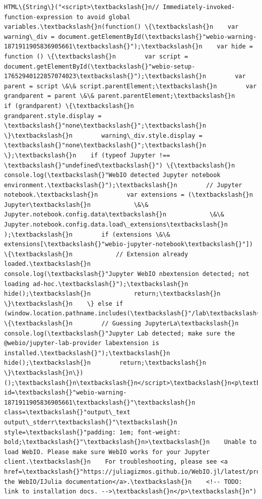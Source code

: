 \documentclass[11pt]{article}
\begin{document}
    \begin{Verbatim}[commandchars=\\\{\}]
HTML\{String\}("<script>\textbackslash{}n// Immediately-invoked-function-expression to avoid global variables.\textbackslash{}n(function() \{\textbackslash{}n    var warning\_div = document.getElementById(\textbackslash{}"webio-warning-1871911905836905661\textbackslash{}");\textbackslash{}n    var hide = function () \{\textbackslash{}n        var script = document.getElementById(\textbackslash{}"webio-setup-17652940122857074023\textbackslash{}");\textbackslash{}n        var parent = script \&\& script.parentElement;\textbackslash{}n        var grandparent = parent \&\& parent.parentElement;\textbackslash{}n        if (grandparent) \{\textbackslash{}n            grandparent.style.display = \textbackslash{}"none\textbackslash{}";\textbackslash{}n        \}\textbackslash{}n        warning\_div.style.display = \textbackslash{}"none\textbackslash{}";\textbackslash{}n    \};\textbackslash{}n    if (typeof Jupyter !== \textbackslash{}"undefined\textbackslash{}") \{\textbackslash{}n        console.log(\textbackslash{}"WebIO detected Jupyter notebook environment.\textbackslash{}");\textbackslash{}n        // Jupyter notebook.\textbackslash{}n        var extensions = (\textbackslash{}n            Jupyter\textbackslash{}n            \&\& Jupyter.notebook.config.data\textbackslash{}n            \&\& Jupyter.notebook.config.data.load\_extensions\textbackslash{}n        );\textbackslash{}n        if (extensions \&\& extensions[\textbackslash{}"webio-jupyter-notebook\textbackslash{}"]) \{\textbackslash{}n            // Extension already loaded.\textbackslash{}n            console.log(\textbackslash{}"Jupyter WebIO nbextension detected; not loading ad-hoc.\textbackslash{}");\textbackslash{}n            hide();\textbackslash{}n            return;\textbackslash{}n        \}\textbackslash{}n    \} else if (window.location.pathname.includes(\textbackslash{}"/lab\textbackslash{}")) \{\textbackslash{}n        // Guessing JupyterLa\textbackslash{}n        console.log(\textbackslash{}"Jupyter Lab detected; make sure the @webio/jupyter-lab-provider labextension is installed.\textbackslash{}");\textbackslash{}n        hide();\textbackslash{}n        return;\textbackslash{}n    \}\textbackslash{}n\})();\textbackslash{}n\textbackslash{}n</script>\textbackslash{}n<p\textbackslash{}n    id=\textbackslash{}"webio-warning-1871911905836905661\textbackslash{}"\textbackslash{}n    class=\textbackslash{}"output\_text output\_stderr\textbackslash{}"\textbackslash{}n    style=\textbackslash{}"padding: 1em; font-weight: bold;\textbackslash{}"\textbackslash{}n>\textbackslash{}n    Unable to load WebIO. Please make sure WebIO works for your Jupyter client.\textbackslash{}n    For troubleshooting, please see <a href=\textbackslash{}"https://juliagizmos.github.io/WebIO.jl/latest/providers/ijulia/\textbackslash{}">\textbackslash{}n    the WebIO/IJulia documentation</a>.\textbackslash{}n    <!-- TODO: link to installation docs. -->\textbackslash{}n</p>\textbackslash{}n")
    \end{Verbatim}
\end{document}
